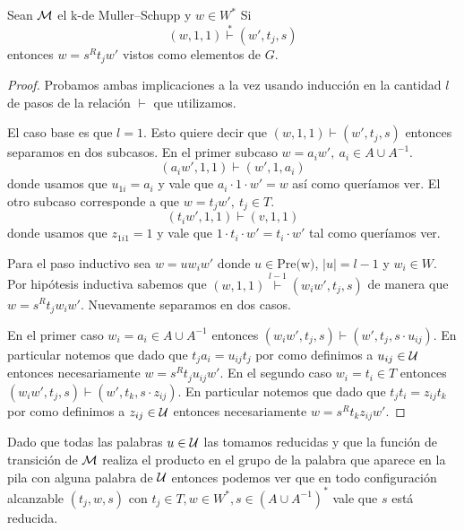 \documentclass[tesis.tex]{subfiles}
\begin{document}
	\begin{lema}\label{lema_MuSc_invariante}
		Sean $\cal M$ el k-\APD de Muller--Schupp y $w \in W^*$ 
		Si  
			\[
				(w,1, 1) \overset{*}{\vdash} (w', t_{j}, s)
			\]
		entonces $w = s^{R}t_{j}w'$ vistos como elementos de $G$.
	\end{lema}
	
	\begin{proof}
		Probamos ambas implicaciones a la vez usando inducción en la cantidad $l$ de pasos de la relación $\vdash$ que utilizamos.

		El caso base es que $l = 1$.
		Esto quiere decir que $(w,1, 1) \overset{}{\vdash} (w', t_{j}, s)$
		entonces separamos en dos subcasos. 
		En el primer subcaso $w = a_{i}w', \ a_{i} \in A \cup A^{-1}$.
		\[
		(a_{i}w', 1, 1 ) \vdash (w',1,a_{i})
		\]
		donde usamos que $u_{1i} = a_{i}$ y vale que  $a_{i} \cdot 1 \cdot w' = w$ así como queríamos ver.
		El otro subcaso corresponde a que $w = t_{j}w', \  t_{j} \in T$.
		\[
		(t_{i}w', 1, 1) \vdash (v, 1,1)
		\]
		donde usamos que $z_{1i1} = 1$ y vale que $1 \cdot t_{i} \cdot w' = t_{i} \cdot w'$ tal como queríamos ver.
		
		Para el paso inductivo sea $w = uw_{i}w'$ donde $u \in \text{Pre(w)}$, $|u| = l-1$ y $w_{i} \in W$.
		Por hipótesis inductiva sabemos que 
		$(w,1,1) \overset{l-1}{\vdash} (w_{i}w',t_{j},s)$ de manera que $w = s^{R}t_{j}w_{i}w'$.
		Nuevamente separamos en dos casos.


		En el primer caso $w_{i} = a_{i} \in A \cup A^{-1}$ entonces 
		$(w_{i}w', t_{j},s) \vdash (w',t_{j} , s \cdot u_{ij})$. 
		En particular notemos que dado que $t_{j}a_{i} = u_{ij}t_{j}$ por como definimos a $u_{ij} \in \cal U$ entonces necesariamente $w = s^{R}t_{j}u_{ij}w'$.
		En el segundo caso $w_{i} = t_{i} \in T$ entonces 
		$(w_{i}w', t_{j},s) \vdash (w',t_{k} , s \cdot z_{ij})$.
		En particular notemos que dado que $t_{j}t_{i} = z_{ij}t_{k}$ por como definimos a $z_{ij} \in \cal U$ entonces necesariamente $w = s^{R}t_{k}z_{ij}w'$.
	\end{proof}

	\begin{obs}
		\label{obs:conf_pal_reducida}
		Dado que todas las palabras $u \in \cal U$ las tomamos reducidas y que la función de transición de $\cal M$ realiza el producto en el grupo de la palabra que aparece en la pila con alguna palabra de $\cal U$ entonces podemos ver que en todo configuración alcanzable $(t_{j},w,s)$ con $t_{j} \in T, w \in W^{*}, s \in (A \cup A^{-1})^{*}$ vale que $s$ está reducida.
	\end{obs}
\end{document}
